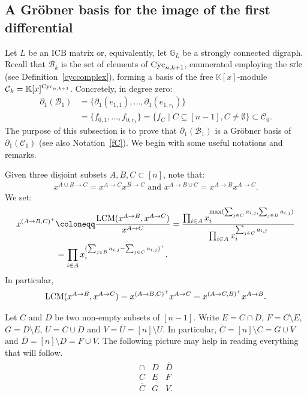 \documentclass[ALCO]{cedram}
\newcommand{\mbk}{\mbox{$\mathbb{K}$}}
\newcommand{\mbg}{\mbox{$\mathbb{G}$}}
\newcommand{\mcb}{\mbox{$\mathcal{B}$}}
\newcommand{\mcc}{\mbox{$\mathcal{C}$}}
\newcommand{\icb}{\mbox{$\mathrm{ICB}$}}
\newcommand{\dif}{\mbox{$\partial$}}
\newcommand{\Lcm}{\mbox{${\rm LCM}$}}
\newcommand{\cyc}{\mbox{${\rm Cyc}$}}
\newcommand{\srle}{\mbox{${\rm srle}$}}
\begin{document}
\subsection{A Gr\"obner basis for the image of the first differential}

 Let $L$ be an $\icb$ matrix or, equivalently, let $\mbg_L$
be a strongly connected digraph.  Recall that $\mcb_k$ is the set of
elements of $\cyc_{n,k+1}$, enumerated employing the $\srle$ (see
Definition~\ref{cyccomplex}), forming a basis of the free
$\mbk[x]$-module $\mcc_k=\mbk[x]^{{\rm Cyc}_{n,k+1}}$. Concretely, in
degree zero: 
\begin{align*}
 \dif_1(\mcb_1)&=\{\dif_{1}(e_{1,1}),\ldots ,\dif_{1}(e_{1,r_1})\}\\
&=\{f_{0,1},\ldots,f_{0,r_1}\}=\{f_C\mid C\subseteq [n-1],
C\neq\emptyset\}\subset \mcc_0.
\end{align*}
The purpose of this subsection is to prove that $\dif_1(\mcb_1)$ is a
Gr\"obner basis of $\dif_1(\mcc_1)$ (see also Notation~\ref{fC}). We
begin with some useful notations and remarks.

\begin{notation}\label{lcm-notation}
Given three disjoint subsets $A,B,C\subset [n]$, note that:
\begin{eqnarray}\label{disjoint}
x^{A\cup B\to C}=x^{A\to C}x^{B\to C}\mbox{ and }x^{A\to B\cup
  C}=x^{A\to B}x^{A\to C}.
\end{eqnarray}
We set:
\begin{align}
x^{(A\to B,C)^+} & \coloneqq
\frac{\Lcm(x^{A\to B},x^{A\to C})}{x^{A\to C}}= 
\frac{\prod_{i\in A}x_i^{\max(\sum_{j\in C}a_{i,j},\sum_{j\in B}a_{i,j})}}
{\prod_{i\in A}x_i^{\sum_{j\in C}a_{i,j}}} \\
&=\prod_{i\in A}x_i^{(\sum_{j\in B}a_{i,j}-\sum_{j\in C}a_{i,j})^{+}}. \notag
\end{align}
In particular,
\begin{eqnarray}\label{lcm-equality}
\Lcm(x^{A\to B},x^{A\to C})=x^{(A\to B,C)^+}x^{A\to C}=x^{(A\to C,B)^+}x^{A\to B}.
\end{eqnarray}
\end{notation}

\begin{notation}\label{FG-notation}
Let $C$ and $D$ be two non-empty subsets of $[n-1]$. Write $E=C\cap
D$, $F=C\setminus E$, $G=D\setminus E$, $U=C\cup D$ and
$V=\overline{U}=[n]\setminus U$. In particular,
$\overline{C}=[n]\setminus C=G\cup V$ and $\overline{D}=[n]\setminus
D=F\cup V$.  The following picture may help in reading everything that
will follow.
\begin{eqnarray*}
\begin{array}{c|c|c}
\cap &D&\overline{D}\\\hline
C&E&F\\\hline
\overline{C}&G&V.
\end{array}
\end{eqnarray*}
\end{notation}
\end{document}
